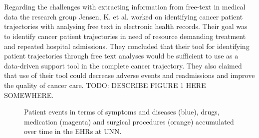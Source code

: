 \\\\
Regarding the challenges with extracting information from free-text in medical data the research group Jensen, K. et al.\cite{freetext} worked on identifying cancer patient trajectories with analysing free text in electronic health records. Their goal was to identify cancer patient trajectories in need of resource demanding treatment and repeated hospital admissions. They concluded that their tool for identifying patient trajectories through free text analyses would be sufficient to use as a data-driven support tool in the complete cancer trajectory. They also claimed that use of their tool could decrease adverse events and readmissions and improve the quality of cancer care. 
TODO: DESCRIBE FIGURE 1 HERE SOMEWHERE. 

\begin{figure}[]
\begin{center}
\end{center}
\caption{Patient events in terms of symptoms and diseases (blue), drugs, medication (magenta) and surgical procedures (orange) accumulated over time in the EHRs at UNN.\cite{freetext}}\label{fig:ackseq}
\end{figure}
 

